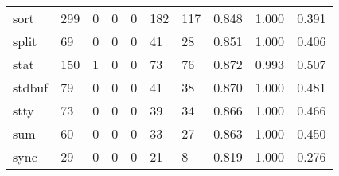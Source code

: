 \begin{longtable}{lp{1.3cm}p{1.3cm}p{1.3cm}p{1.3cm}p{1.3cm}p{1.3cm}p{1.3cm}p{1.3cm}p{1.3cm}}
sort      &                    299 &                                             0 &                                            0 &                                           0 &                                          182 &                                        117 &                                0.848 &                                  1.000 &                                0.391 \\
split     &                     69 &                                             0 &                                            0 &                                           0 &                                           41 &                                         28 &                                0.851 &                                  1.000 &                                0.406 \\
stat      &                    150 &                                             1 &                                            0 &                                           0 &                                           73 &                                         76 &                                0.872 &                                  0.993 &                                0.507 \\
stdbuf    &                     79 &                                             0 &                                            0 &                                           0 &                                           41 &                                         38 &                                0.870 &                                  1.000 &                                0.481 \\
stty      &                     73 &                                             0 &                                            0 &                                           0 &                                           39 &                                         34 &                                0.866 &                                  1.000 &                                0.466 \\
sum       &                     60 &                                             0 &                                            0 &                                           0 &                                           33 &                                         27 &                                0.863 &                                  1.000 &                                0.450 \\
sync      &                     29 &                                             0 &                                            0 &                                           0 &                                           21 &                                          8 &                                0.819 &                                  1.000 &                                0.276 \\

\end{longtable}
